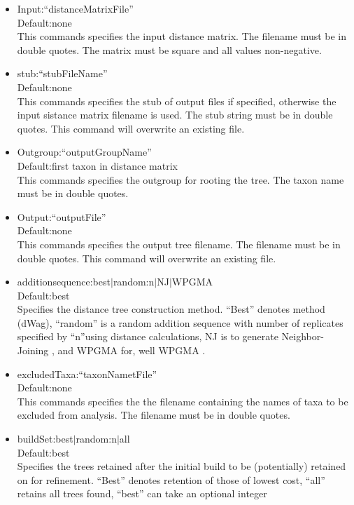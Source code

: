 \documentclass[11pt]{memoir}
\begin{document}
	
	\begin{itemize}
		\item {Input:``distanceMatrixFile''\\Default:none\\This commands specifies the input distance matrix.  The filename must be in double quotes.
			The matrix must be square and all values non-negative.  
		}
		\item{stub:``stubFileName''\\Default:none\\This commands specifies the stub of output files if specified, otherwise the input sistance matrix filename is used.  The stub string must be in double quotes.  This command will overwrite an existing file.
		}
		\item {Outgroup:``outputGroupName''\\Default:first taxon in distance matrix\\This commands specifies the outgroup for rooting the tree.  The taxon name  must be in double quotes.
		}
		\item {Output:``outputFile''\\Default:none\\This commands specifies the output tree filename.  The filename must be in double quotes.
			This command will overwrite an existing file.
		}
		\item{additionsequence:best$\mid$random:n$\mid$NJ$\mid$WPGMA\\Default:best\\Specifies the distance tree construction method.
			``Best'' denotes \cite{Farris1972} method (dWag), ``random'' is a random addition sequence with number of replicates specified by ``n''using \cite{Farris1972} distance calculations,
			NJ is to generate Neighbor-Joining \citep{Saitou1987}, and WPGMA for, well WPGMA \citep{SokalandMichener1958}.
		}
		\item {excludedTaxa:``taxonNametFile''\\Default:none\\This commands specifies the the filename containing the names of taxa to be
			 excluded from analysis.  
			The filename must be in double quotes.
		}
		\item{buildSet:best$\mid$random:n$\mid$all\\Default:best\\Specifies the trees retained after the initial build to be (potentially) retained
			on for refinement.
			``Best'' denotes retention of those of lowest cost, ``all'' retains all trees found, ``best'' can take an optional integer
}
\end{itemize}
\end{document}
